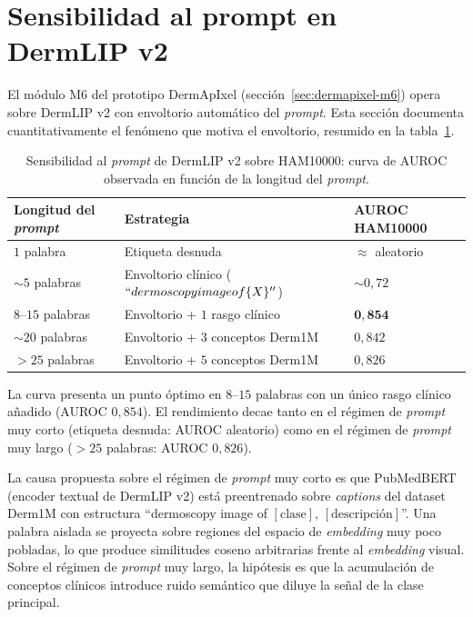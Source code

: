 \section{Sensibilidad al prompt en DermLIP v2}
\label{sec:anexoh-prompt-derm}

El módulo M6 del prototipo DermApIxel
(sección~\ref{sec:dermapixel-m6}) opera sobre DermLIP v2 con
envoltorio automático del \emph{prompt}. Esta sección documenta
cuantitativamente el fenómeno que motiva el envoltorio, resumido en
la tabla~\ref{tab:anexoh-prompt-curva}.

\begin{table}[H]
\centering
\footnotesize
\setlength{\tabcolsep}{4pt}
\renewcommand{\arraystretch}{0.95}
\caption{Sensibilidad al \emph{prompt} de DermLIP v2 sobre
HAM10000: curva de AUROC observada en función de la longitud
del \emph{prompt}.}
\label{tab:anexoh-prompt-curva}
\begin{tabular}{lll}
\hline
Longitud del \emph{prompt}              & Estrategia                                         & AUROC HAM10000 \\
\hline
$1$ palabra                             & Etiqueta desnuda                                    & $\approx$ aleatorio \\
$\sim 5$ palabras                       & Envoltorio clínico ($``dermoscopy image of \{X\}''$) & $\sim 0{,}72$ \\
$8$--$15$ palabras                      & Envoltorio + $1$ rasgo clínico                      & $\mathbf{0{,}854}$ \\
$\sim 20$ palabras                      & Envoltorio + $3$ conceptos Derm1M                   & $0{,}842$ \\
$> 25$ palabras                         & Envoltorio + $5$ conceptos Derm1M                   & $0{,}826$ \\
\hline
\end{tabular}
\end{table}

La curva presenta un punto óptimo en $8$--$15$ palabras con
un único rasgo clínico añadido (AUROC $0{,}854$). El
rendimiento decae tanto en el régimen de \emph{prompt} muy corto
(etiqueta desnuda: AUROC aleatorio) como en el régimen de
\emph{prompt} muy largo ($>25$ palabras: AUROC $0{,}826$).

La causa propuesta sobre el régimen de \emph{prompt} muy corto es
que PubMedBERT (encoder textual de DermLIP v2) está preentrenado
sobre \emph{captions} del dataset Derm1M con estructura
``dermoscopy image of $[\text{clase}]$, $[\text{descripción}]$''.
Una palabra aislada se proyecta sobre regiones del espacio de
\emph{embedding} muy poco pobladas, lo que produce similitudes
coseno arbitrarias frente al \emph{embedding} visual. Sobre el
régimen de \emph{prompt} muy largo, la hipótesis es que la
acumulación de conceptos clínicos introduce ruido semántico que
diluye la señal de la clase principal.

